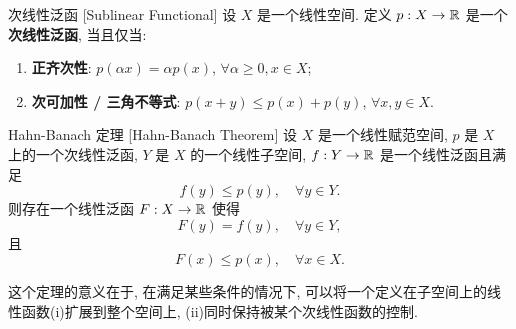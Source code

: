         \begin{dfn}
            {次线性泛函}
            [Sublinear Functional]
            设 \(X\) 是一个线性空间. 定义 \(p:X\to\operatorname{\mathbb{R}}\) 是一个\textbf{次线性泛函}, 当且仅当:
            \begin{enumerate}[label=(\roman*)]
                \item \textbf{正齐次性}: \(p(\alpha x)=\alpha p(x)\), \(\forall \alpha\geq 0, x\in X\);
                \item \textbf{次可加性 / 三角不等式}: \(p(x+y)\leq p(x)+p(y)\), \(\forall x,y\in X\).
            \end{enumerate}
        \end{dfn}

        \begin{thm}
            {Hahn-Banach 定理}
            [Hahn-Banach Theorem]
            设 \(X\) 是一个线性赋范空间, \(p\) 是 \(X\) 上的一个次线性泛函, \(Y\) 是 \(X\) 的一个线性子空间, \(f:Y\to\operatorname{\mathbb{R}}\) 是一个线性泛函且满足
            \[f(y)\leq p(y), \quad \forall y\in Y.\]
            则存在一个线性泛函 \(F:X\to\operatorname{\mathbb{R}}\) 使得
            \[F(y)=f(y), \quad \forall y\in Y,\]
            且
            \[F(x)\leq p(x), \quad \forall x\in X.\]
        \end{thm}

        \begin{rmk}
            [Dedicatia]
            这个定理的意义在于, 在满足某些条件的情况下, 可以将一个定义在子空间上的线性函数(i)扩展到整个空间上, (ii)同时保持被某个次线性函数的控制.
        \end{rmk}

